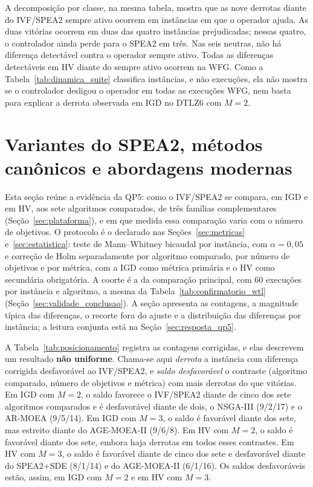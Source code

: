 A decomposição por classe, na mesma tabela, mostra que as nove derrotas diante do IVF/SPEA2 sempre ativo ocorrem em instâncias em que o operador ajuda. As duas vitórias ocorrem em duas das quatro instâncias prejudicadas; nessas quatro, o controlador ainda perde para o SPEA2 em três. Nas seis neutras, não há diferença detectável contra o operador sempre ativo. Todas as diferenças detectáveis em HV diante do sempre ativo ocorrem na WFG. Como a Tabela~\ref{tab:dinamica_suite} classifica instâncias, e não execuções, ela não mostra se o controlador desligou o operador em todas as execuções WFG, nem basta para explicar a derrota observada em IGD no DTLZ6 com $M=2$.

\section{Variantes do SPEA2, métodos canônicos e abordagens modernas}
\label{sec:posicionamento}

Esta seção reúne a evidência da QP5: como o IVF/SPEA2 se compara, em IGD e em HV, aos sete algoritmos comparados, de três famílias complementares (Seção~\ref{sec:plataforma}), e em que medida essa comparação varia com o número de objetivos. O protocolo é o declarado nas Seções~\ref{sec:metricas} e~\ref{sec:estatistica}: teste de Mann--Whitney bicaudal por instância, com $\alpha = 0{,}05$ e correção de Holm separadamente por algoritmo comparado, por número de objetivos e por métrica, com a IGD como métrica primária e o HV como secundária obrigatória. A coorte é a da comparação principal, com 60 execuções por instância e algoritmo, a mesma da Tabela~\ref{tab:confirmatorio_wtl} (Seção~\ref{sec:validade_conclusao}). A seção apresenta as contagens, a magnitude típica das diferenças, o recorte fora do ajuste e a distribuição das diferenças por instância; a leitura conjunta está na Seção~\ref{sec:resposta_qp5}.

A Tabela~\ref{tab:posicionamento} registra as contagens corrigidas, e elas descrevem um resultado \textbf{não uniforme}. Chama-se aqui \emph{derrota} a instância com diferença corrigida desfavorável ao IVF/SPEA2, e \emph{saldo desfavorável} o contraste (algoritmo comparado, número de objetivos e métrica) com mais derrotas do que vitórias. Em IGD com $M = 2$, o saldo favorece o IVF/SPEA2 diante de cinco dos sete algoritmos comparados e é desfavorável diante de dois, o NSGA-III (9/2/17) e o AR-MOEA (9/5/14). Em IGD com $M = 3$, o saldo é favorável diante dos sete, mas estreito diante do AGE-MOEA-II (9/6/8). Em HV com $M = 2$, o saldo é favorável diante dos sete, embora haja derrotas em todos esses contrastes. Em HV com $M = 3$, o saldo é favorável diante de cinco dos sete e desfavorável diante do SPEA2+SDE (8/1/14) e do AGE-MOEA-II (6/1/16). Os saldos desfavoráveis estão, assim, em IGD com $M = 2$ e em HV com $M = 3$.

